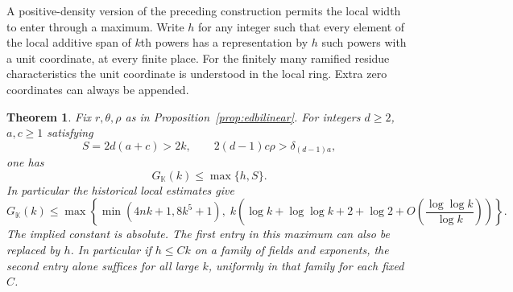 \documentclass[11pt,letterpaper]{article}
\newtheorem{theorem}{Theorem}[section]
\theoremstyle{definition}
\numberwithin{equation}{section}
\begin{document}
A positive-density version of the preceding construction permits the
local width to enter through a maximum. Write $h$ for any integer such
that every element of the local additive span of $k$th powers has a
representation by $h$ such powers with a unit coordinate, at every
finite place. For the finitely many ramified residue characteristics
the unit coordinate is understood in the local ring. Extra zero
coordinates can always be appended.

\begin{theorem}\label{thm:edmaximum}
Fix $r,\theta,\rho$ as in Proposition~\ref{prop:edbilinear}. For
integers $d\ge2$, $a,c\ge1$ satisfying
\[
 S=2d(a+c)>2k,\qquad 2(d-1)c\rho>\delta_{(d-1)a},
\]
one has
\begin{equation}\label{eq:edmaxfinite}
                  G_{\mathbb K}(k)\le\max\{h,S\}.
\end{equation}
In particular the historical local estimates give
\begin{equation}\label{eq:edmaxhistorical}
 G_{\mathbb K}(k)\le\max\!\left\{
 \min(4nk+1,8k^5+1),\;
 k\left(\log k+\log\log k+2+\log2+
      O\!\left(\frac{\log\log k}{\log k}\right)\right)\right\}.
\end{equation}
The implied constant is absolute. The first entry in this maximum
can also be replaced by $h$. In particular if $h\le Ck$ on a family
of fields and exponents, the second entry alone suffices for all
large $k$, uniformly in that family for each fixed $C$.
\end{theorem}
\end{document}

